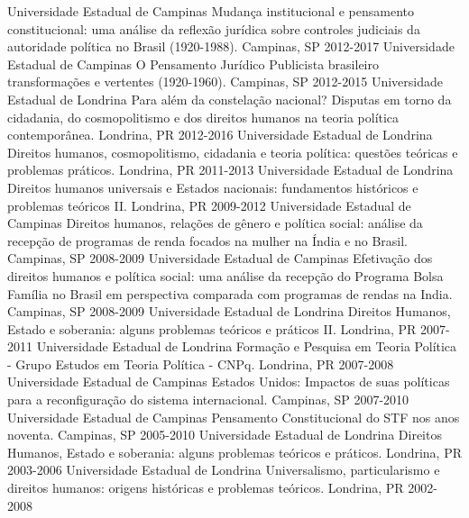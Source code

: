 \begin{cvhonors}
  \cvprohonor
    {Universidade Estadual de Campinas}
    {Mudança institucional e pensamento constitucional: uma análise da reflexão jurídica sobre controles judiciais da autoridade política no Brasil (1920-1988).}
    {Campinas, SP}
    {2012-2017}
  \cvprohonor
    {Universidade Estadual de Campinas}
    {O Pensamento Jurídico Publicista brasileiro transformações e vertentes (1920-1960).}
    {Campinas, SP}
    {2012-2015}
  \cvprohonor
    {Universidade Estadual de Londrina}
    {Para além da constelação nacional? Disputas em torno da cidadania, do cosmopolitismo e dos direitos humanos na teoria política contemporânea.}
    {Londrina, PR}
    {2012-2016}
  \cvprohonor
    {Universidade Estadual de Londrina}
    {Direitos humanos, cosmopolitismo, cidadania e teoria política: questões teóricas e problemas práticos.}
    {Londrina, PR}
    {2011-2013}
  \cvprohonor
    {Universidade Estadual de Londrina}
    {Direitos humanos universais e Estados nacionais: fundamentos históricos e problemas teóricos II.}
    {Londrina, PR}
    {2009-2012}
  \cvprohonor
    {Universidade Estadual de Campinas}
    {Direitos humanos, relações de gênero e política social: análise da recepção de programas de renda focados na mulher na Índia e no Brasil.}
    {Campinas, SP}
    {2008-2009}
  \cvprohonor
    {Universidade Estadual de Campinas}
    {Efetivação dos direitos humanos e política social: uma análise da recepção do Programa Bolsa Família no Brasil em perspectiva comparada com programas de rendas na India.}
    {Campinas, SP}
    {2008-2009}
  \cvprohonor
    {Universidade Estadual de Londrina}
    {Direitos Humanos, Estado e soberania: alguns problemas teóricos e práticos II.}
    {Londrina, PR}
    {2007-2011}
  \cvprohonor
    {Universidade Estadual de Londrina}
    {Formação e Pesquisa em Teoria Política - Grupo Estudos em Teoria Política - CNPq.}
    {Londrina, PR}
    {2007-2008}
  \cvprohonor
    {Universidade Estadual de Campinas}
    {Estados Unidos: Impactos de suas políticas para a reconfiguração do sistema internacional.}
    {Campinas, SP}
    {2007-2010}
  \cvprohonor
    {Universidade Estadual de Campinas}
    {Pensamento Constitucional do STF nos anos noventa.}
    {Campinas, SP}
    {2005-2010}
  \cvprohonor
    {Universidade Estadual de Londrina}
    {Direitos Humanos, Estado e soberania: alguns problemas teóricos e práticos.}
    {Londrina, PR}
    {2003-2006}
  \cvprohonor
    {Universidade Estadual de Londrina}
    {Universalismo, particularismo e direitos humanos: origens históricas e problemas teóricos.}
    {Londrina, PR}
    {2002-2008}
\end{cvhonors}
